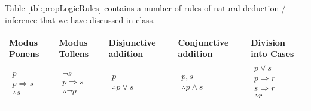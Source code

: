 \documentclass[letterpaper,10pt]{article}
\begin{document}
Table \ref{tbl:propLogicRules} contains a number of rules of natural deduction / inference that we have discussed in class.

\begin{table}[H]
	\centering
	\begin{tabular}{|p{2.8cm}|p{2.8cm}|p{2.8cm}|p{2.8cm}| p{2.8cm}|}\hline
		\textbf{Modus Ponens} & \textbf{Modus Tollens} & \textbf{Disjunctive addition} & \textbf{Conjunctive addition} & \textbf{Division into Cases}\\ \hline
			$\begin{aligned}
		p  \\
		p \Rightarrow s \\
		\therefore s
	\end{aligned}$ & 
	 $\begin{aligned}
		\neg s  \\
		p \Rightarrow s \\
		\therefore \neg p
	\end{aligned}$ & 
	 $\begin{aligned}
		p  \\
		\therefore p \lor s
	\end{aligned}$ &
	$\begin{aligned}
		p, s \\
		\therefore p \land s
	\end{aligned}$ & 
	$\begin{aligned}
		p \lor s \\
 		p \Rightarrow r \\ 
		s \Rightarrow r \\
 \therefore r\\
	\end{aligned}$ \\ \hline
		 

\end{tabular}
\end{table}
\end{document}
